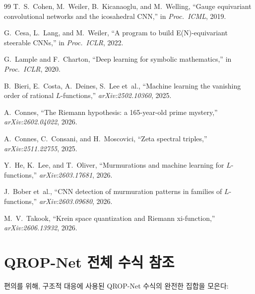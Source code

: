 \documentclass[11pt, a4paper]{article}
\theoremstyle{definition}
\theoremstyle{plain}
\begin{document}
\begin{thebibliography}{99}
T.~S.~Cohen, M.~Weiler, B.~Kicanaoglu, and M.~Welling,
``Gauge equivariant convolutional networks and the icosahedral CNN,''
in \textit{Proc.\ ICML}, 2019.

G.~Cesa, L.~Lang, and M.~Weiler,
``A program to build E(N)-equivariant steerable CNNs,''
in \textit{Proc.\ ICLR}, 2022.

G.~Lample and F.~Charton,
``Deep learning for symbolic mathematics,''
in \textit{Proc.\ ICLR}, 2020.

B.~Bieri, E.~Costa, A.~Deines, S.~Lee et~al.,
``Machine learning the vanishing order of rational $L$-functions,''
\textit{arXiv:2502.10360}, 2025.

A.~Connes,
``The Riemann hypothesis: a 165-year-old prime mystery,''
\textit{arXiv:2602.04022}, 2026.

A.~Connes, C.~Consani, and H.~Moscovici,
``Zeta spectral triples,''
\textit{arXiv:2511.22755}, 2025.

Y.~He, K.~Lee, and T.~Oliver,
``Murmurations and machine learning for $L$-functions,''
\textit{arXiv:2603.17681}, 2026.

J.~Bober et~al.,
``CNN detection of murmuration patterns in families of $L$-functions,''
\textit{arXiv:2603.09680}, 2026.

M.~V.~Takook,
``Krein space quantization and Riemann xi-function,''
\textit{arXiv:2606.13932}, 2026.

\end{thebibliography}


\appendix

\section{QROP-Net 전체 수식 참조}
\label{app:qropnet_eqs}

편의를 위해, 구조적 대응에 사용된 QROP-Net 수식의 완전한 집합을 모은다:
\end{document}
